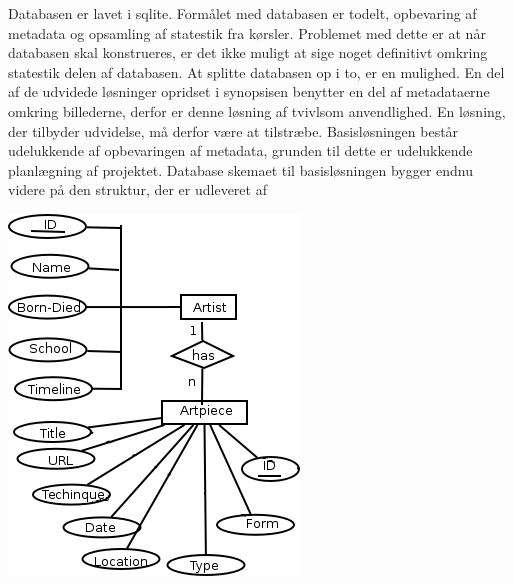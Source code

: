 Databasen er lavet i sqlite.
Formålet med databasen er todelt, opbevaring af metadata og opsamling af statestik fra kørsler.
Problemet med dette er at når databasen skal konstrueres, er det ikke muligt at sige noget definitivt omkring statestik delen af databasen.
At splitte databasen op i to, er en mulighed. 
En del af de udvidede løsninger opridset i synopsisen benytter en del af metadataerne omkring billederne, derfor er denne løsning af tvivlsom anvendlighed.
En løsning, der tilbyder udvidelse, må derfor være at tilstræbe.
Basisløsningen består udelukkende af opbevaringen af metadata, grunden til dette er udelukkende planlægning af projektet.
Database skemaet til basisløsningen bygger endnu videre på den struktur,
der er udleveret af \cite{wgahu}

\newpage
\includegraphics[scale=0.9]{afsnit/vores_implementation/ER}
